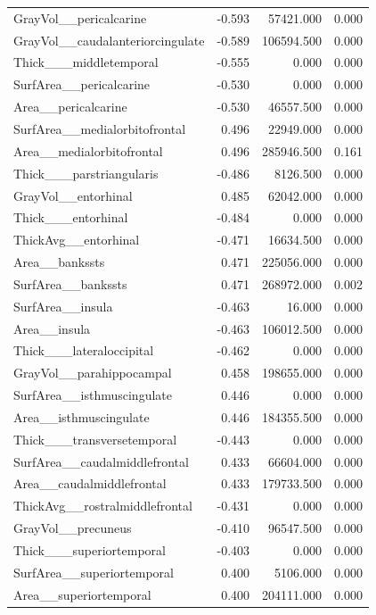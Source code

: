 \documentclass{article}
\begin{document}
\begin{longtable}{lrrr}
	GrayVol\_\_pericalcarine & -0.593 & 57421.000 & 0.000 \\
	GrayVol\_\_caudalanteriorcingulate & -0.589 & 106594.500 & 0.000 \\
	Thick\_\_\_middletemporal & -0.555 & 0.000 & 0.000 \\
	SurfArea\_\_pericalcarine & -0.530 & 0.000 & 0.000 \\
	Area\_\_pericalcarine & -0.530 & 46557.500 & 0.000 \\
	SurfArea\_\_medialorbitofrontal & 0.496 & 22949.000 & 0.000 \\
	Area\_\_medialorbitofrontal & 0.496 & 285946.500 & 0.161 \\
	Thick\_\_\_parstriangularis & -0.486 & 8126.500 & 0.000 \\
	GrayVol\_\_entorhinal & 0.485 & 62042.000 & 0.000 \\
	Thick\_\_\_entorhinal & -0.484 & 0.000 & 0.000 \\
	ThickAvg\_\_entorhinal & -0.471 & 16634.500 & 0.000 \\
	Area\_\_bankssts & 0.471 & 225056.000 & 0.000 \\
	SurfArea\_\_bankssts & 0.471 & 268972.000 & 0.002 \\
	SurfArea\_\_insula & -0.463 & 16.000 & 0.000 \\
	Area\_\_insula & -0.463 & 106012.500 & 0.000 \\
	Thick\_\_\_lateraloccipital & -0.462 & 0.000 & 0.000 \\
	GrayVol\_\_parahippocampal & 0.458 & 198655.000 & 0.000 \\
	SurfArea\_\_isthmuscingulate & 0.446 & 0.000 & 0.000 \\
	Area\_\_isthmuscingulate & 0.446 & 184355.500 & 0.000 \\
	Thick\_\_\_transversetemporal & -0.443 & 0.000 & 0.000 \\
	SurfArea\_\_caudalmiddlefrontal & 0.433 & 66604.000 & 0.000 \\
	Area\_\_caudalmiddlefrontal & 0.433 & 179733.500 & 0.000 \\
	ThickAvg\_\_rostralmiddlefrontal & -0.431 & 0.000 & 0.000 \\
	GrayVol\_\_precuneus & -0.410 & 96547.500 & 0.000 \\
	Thick\_\_\_superiortemporal & -0.403 & 0.000 & 0.000 \\
	SurfArea\_\_superiortemporal & 0.400 & 5106.000 & 0.000 \\
	Area\_\_superiortemporal & 0.400 & 204111.000 & 0.000 \\

\end{longtable}
\end{document}
